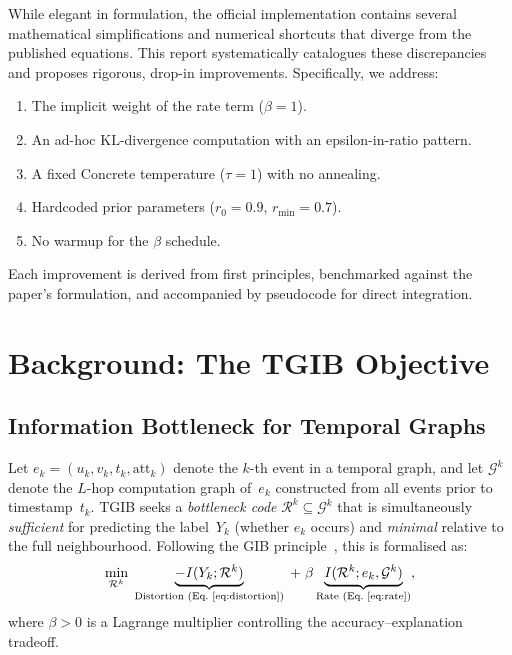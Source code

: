 \documentclass[11pt,a4paper]{article}
\newcommand{\R}{\mathcal{R}}
\newcommand{\G}{\mathcal{G}}
\newcommand{\KL}{\mathrm{KL}}
\newcommand{\I}{I}
\begin{document}
While elegant in formulation, the official implementation contains
several mathematical simplifications and numerical shortcuts that
diverge from the published equations. This report systematically
catalogues these discrepancies and proposes rigorous, drop-in
improvements. Specifically, we address:

\begin{enumerate}[leftmargin=*,itemsep=2pt]
  \item The implicit weight of the rate term ($\beta = 1$).
  \item An ad-hoc $\KL$-divergence computation with an
        epsilon-in-ratio pattern.
  \item A fixed Concrete temperature ($\tau = 1$) with no annealing.
  \item Hardcoded prior parameters ($r_0 = 0.9$, $r_{\min} = 0.7$).
  \item No warmup for the $\beta$ schedule.
\end{enumerate}

Each improvement is derived from first principles, benchmarked against
the paper's formulation, and accompanied by pseudocode for direct
integration.

\section{Background: The TGIB Objective}
\label{sec:background}

\subsection{Information Bottleneck for Temporal Graphs}

Let $e_k = (u_k, v_k, t_k, \mathrm{att}_k)$ denote the $k$-th event in
a temporal graph, and let $\G^k$ denote the $L$-hop computation graph
of~$e_k$ constructed from all events prior to timestamp~$t_k$. TGIB
seeks a \emph{bottleneck code} $\R^k \subseteq \G^k$ that is
simultaneously \emph{sufficient} for predicting the label~$Y_k$
(whether $e_k$ occurs) and \emph{minimal} relative to the full
neighbourhood. Following the GIB principle~\cite{wu2020gib}, this is
formalised as:
\begin{equation}
\label{eq:gib_objective}
\min_{\R^k} \; \underbrace{-\I(Y_k ; \R^k)}_{\text{Distortion (Eq.~\ref{eq:distortion})}}
  \;+\; \beta \underbrace{\I(\R^k ; e_k, \G^k)}_{\text{Rate (Eq.~\ref{eq:rate})}},
\end{equation}
where $\beta > 0$ is a Lagrange multiplier controlling the
accuracy--explanation tradeoff.
\end{document}
